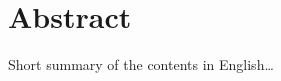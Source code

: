 \begingroup
\let\clearpage\relax
\let\cleardoublepage\relax
\let\cleardoublepage\relax

\chapter*{Abstract}
Short summary of the contents in English\dots


\endgroup			

\vfill
